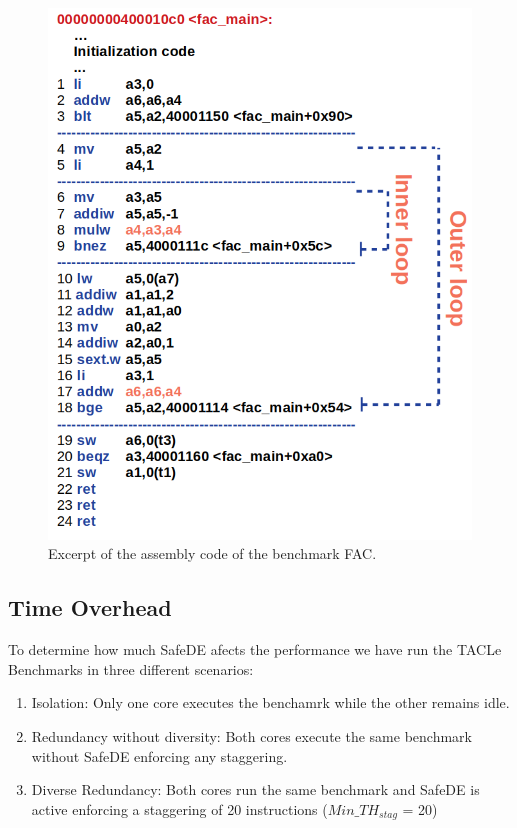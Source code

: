 \begin{figure}[h]
    \centering
    \includegraphics[scale=0.4]{img/fac_assembly.png}
    \caption{Excerpt of the assembly code of the benchmark FAC.} 
    \label{fig:fac_assembly}
\end{figure}

\bigskip



\subsection{Time Overhead}

To determine how much SafeDE afects the performance we have run the TACLe Benchmarks in three different scenarios:

\begin{enumerate}
    \item Isolation: Only one core executes the benchamrk while the other remains idle.
    \item Redundancy without diversity: Both cores execute the same benchmark without SafeDE enforcing any staggering. 
    \item Diverse Redundancy: Both cores run the same benchmark and SafeDE is active enforcing a staggering of 20 instructions ($Min\_TH_{stag}$ = 20)
\end{enumerate}

